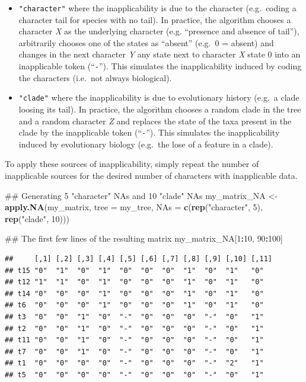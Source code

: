 \documentclass[]{book}
\newenvironment{Shaded}{\begin{snugshade}}{\end{snugshade}}
\newcommand{\KeywordTok}[1]{\textcolor[rgb]{0.13,0.29,0.53}{\textbf{#1}}}
\newcommand{\DataTypeTok}[1]{\textcolor[rgb]{0.13,0.29,0.53}{#1}}
\newcommand{\DecValTok}[1]{\textcolor[rgb]{0.00,0.00,0.81}{#1}}
\newcommand{\StringTok}[1]{\textcolor[rgb]{0.31,0.60,0.02}{#1}}
\newcommand{\OperatorTok}[1]{\textcolor[rgb]{0.81,0.36,0.00}{\textbf{#1}}}
\newcommand{\NormalTok}[1]{#1}
\providecommand{\tightlist}{%
  \setlength{\itemsep}{0pt}\setlength{\parskip}{0pt}}
\theoremstyle{definition}
\theoremstyle{definition}
\theoremstyle{definition}
\theoremstyle{remark}
\begin{document}
\begin{itemize}
\tightlist
\item
  \texttt{"character"} where the inapplicability is due to the character
  (e.g.~coding a character tail for species with no tail). In practice,
  the algorithm chooses a character \emph{X} as the underlying character
  (e.g. ``presence and absence of tail''), arbitrarily chooses one of
  the states as ``absent'' (e.g.~0 = absent) and changes in the next
  character \emph{Y} any state next to character \emph{X} state 0 into
  an inapplicable token (``\texttt{-}''). This simulates the
  inapplicability induced by coding the characters (i.e.~not always
  biological).
\item
  \texttt{"clade"} where the inapplicability is due to evolutionary
  history (e.g.~a clade loosing its tail). In practice, the algorithm
  chooses a random clade in the tree and a random character \emph{Z} and
  replaces the state of the taxa present in the clade by the
  inapplicable token (``\texttt{-}''). This simulates the
  inapplicability induced by evolutionary biology (e.g.~the lose of a
  feature in a clade).
\end{itemize}

To apply these sources of inapplicability, simply repeat the number of
inapplicable sources for the desired number of characters with
inapplicable data.

\begin{Shaded}
\begin{Highlighting}[]
\NormalTok{## Generating 5 "character" NAs and 10 "clade" NAs}
\NormalTok{my_matrix_NA <-}\StringTok{ }\KeywordTok{apply.NA}\NormalTok{(my_matrix, }\DataTypeTok{tree =}\NormalTok{ my_tree,}
                         \DataTypeTok{NAs =} \KeywordTok{c}\NormalTok{(}\KeywordTok{rep}\NormalTok{(}\StringTok{"character"}\NormalTok{, }\DecValTok{5}\NormalTok{), }\KeywordTok{rep}\NormalTok{(}\StringTok{"clade"}\NormalTok{, }\DecValTok{10}\NormalTok{)))}

\NormalTok{## The first few lines of the resulting matrix}
\NormalTok{my_matrix_NA[}\DecValTok{1}\OperatorTok{:}\DecValTok{10}\NormalTok{, }\DecValTok{90}\OperatorTok{:}\DecValTok{100}\NormalTok{]}
\end{Highlighting}
\end{Shaded}

\begin{verbatim}
##     [,1] [,2] [,3] [,4] [,5] [,6] [,7] [,8] [,9] [,10] [,11]
## t15 "0"  "1"  "0"  "1"  "0"  "0"  "0"  "1"  "0"  "1"   "0"  
## t12 "1"  "1"  "0"  "1"  "0"  "0"  "0"  "1"  "0"  "1"   "0"  
## t14 "0"  "0"  "0"  "1"  "0"  "0"  "0"  "1"  "0"  "1"   "0"  
## t6  "0"  "0"  "0"  "1"  "0"  "0"  "0"  "1"  "0"  "1"   "0"  
## t3  "0"  "0"  "1"  "0"  "-"  "0"  "0"  "0"  "-"  "0"   "1"  
## t2  "0"  "0"  "1"  "0"  "-"  "0"  "0"  "0"  "-"  "0"   "1"  
## t11 "0"  "0"  "1"  "0"  "-"  "0"  "0"  "0"  "-"  "0"   "1"  
## t7  "0"  "0"  "1"  "0"  "-"  "0"  "0"  "0"  "-"  "0"   "1"  
## t1  "0"  "0"  "0"  "0"  "-"  "0"  "0"  "0"  "-"  "2"   "1"  
## t5  "0"  "0"  "0"  "0"  "-"  "0"  "0"  "0"  "-"  "0"   "1"
\end{verbatim}
\end{document}
